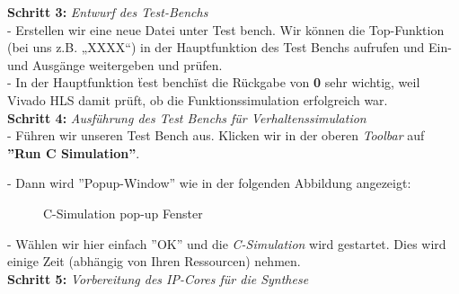 \documentclass[a4paper]{report}
\begin{document}
\textbf{Schritt 3:} \textit{Entwurf des Test-Benchs}\\

- Erstellen wir eine neue Datei unter Test bench. Wir können die Top-Funktion (bei uns z.B. „XXXX“) in der Hauptfunktion des Test Benchs aufrufen und Ein- und Ausgänge weitergeben und prüfen.\\

- In der Hauptfunktion \"test bench\" ist die Rückgabe von \textbf{0} sehr wichtig, weil Vivado HLS damit prüft, ob die Funktionssimulation erfolgreich war.\\

\textbf{Schritt 4:} \textit{Ausführung des Test Benchs für Verhaltenssimulation}\\

- Führen wir unseren Test Bench aus. Klicken wir in der oberen \textit{Toolbar} auf \textbf{''Run C Simulation''}.

- Dann wird ''Popup-Window'' wie in der folgenden Abbildung angezeigt:\\

\begin{figure}[H]
\centering
{}
\caption{C-Simulation pop-up Fenster}
\label{fig:C_Simulation_pop_-_up_Fenster}
\end{figure}

- Wählen wir hier einfach ''OK'' und die \textit{C-Simulation} wird gestartet. Dies wird einige Zeit (abhängig von Ihren Ressourcen) nehmen.\\

\textbf{Schritt 5:} \textit{Vorbereitung des IP-Cores für die Synthese}\\
\end{document}
